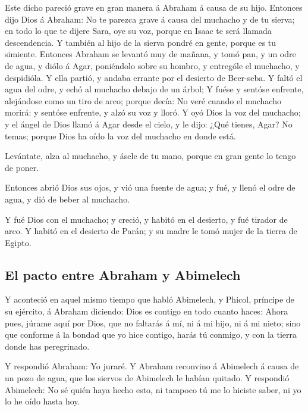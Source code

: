  Este dicho pareció grave en gran manera á Abraham á
causa de su hijo.  Entonces dijo Dios á Abraham: No te
parezca grave á causa del muchacho y de tu sierva; en todo lo que te
dijere Sara, oye su voz, porque en Isaac te será llamada descendencia.
 Y también al hijo de la sierva pondré en gente, porque
es tu simiente.  Entonces Abraham se levantó muy de
mañana, y tomó pan, y un odre de agua, y diólo á Agar, poniéndolo sobre
su hombro, y entrególe el muchacho, y despidióla. Y ella partió, y
andaba errante por el desierto de Beer-seba.  Y faltó el
agua del odre, y echó al muchacho debajo de un árbol;  Y
fuése y sentóse enfrente, alejándose como un tiro de arco; porque decía:
No veré cuando el muchacho morirá: y sentóse enfrente, y alzó su voz y
lloró.  Y oyó Dios la voz del muchacho; y el ángel de
Dios llamó á Agar desde el cielo, y le dijo: ¿Qué tienes, Agar? No
temas; porque Dios ha oído la voz del muchacho en donde está.

 Levántate, alza al muchacho, y ásele de tu mano, porque
en gran gente lo tengo de poner.

 Entonces abrió Dios sus ojos, y vió una fuente de agua;
y fué, y llenó el odre de agua, y dió de beber al muchacho.

 Y fué Dios con el muchacho; y creció, y habitó en el
desierto, y fué tirador de arco.  Y habitó en el desierto
de Parán; y su madre le tomó mujer de la tierra de Egipto.

\hypertarget{el-pacto-entre-abraham-y-abimelech}{%
\subsection{El pacto entre Abraham y
Abimelech}\label{el-pacto-entre-abraham-y-abimelech}}

 Y aconteció en aquel mismo tiempo que habló Abimelech, y
Phicol, príncipe de su ejército, á Abraham diciendo: Dios es contigo en
todo cuanto haces:  Ahora pues, júrame aquí por Dios, que
no faltarás á mí, ni á mi hijo, ni á mi nieto; sino que conforme á la
bondad que yo hice contigo, harás tú conmigo, y con la tierra donde has
peregrinado.

 Y respondió Abraham: Yo juraré.  Y
Abraham reconvino á Abimelech á causa de un pozo de agua, que los
siervos de Abimelech le habían quitado.  Y respondió
Abimelech: No sé quién haya hecho esto, ni tampoco tú me lo hiciste
saber, ni yo lo he oído hasta hoy.

